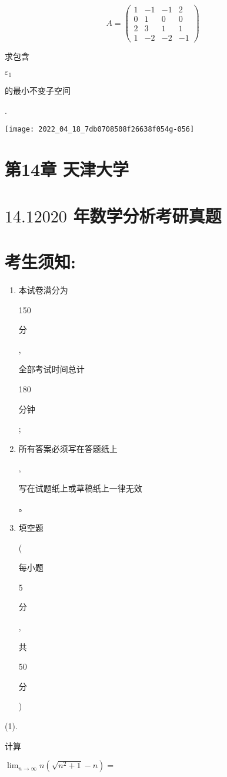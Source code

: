 \documentclass[10pt]{article}
\begin{document}
\begin{enumerate}
\end{enumerate}
$$
A=\left(\begin{array}{cccc}
1 & -1 & -1 & 2 \\
0 & 1 & 0 & 0 \\
2 & 3 & 1 & 1 \\
1 & -2 & -2 & -1
\end{array}\right)
$$
\begin{CJK}{UTF8}{mj}求包含\end{CJK} $\varepsilon_{1}$ \begin{CJK}{UTF8}{mj}的最小不变子空间\end{CJK}.

\texttt{[image: 2022\_04\_18\_7db0708508f26638f054g-056]}

\section{第14章 天津大学}
\section{$14.12020$ 年数学分析考研真题}
\section{考生须知:}
\begin{enumerate}
  \item \begin{CJK}{UTF8}{mj}本试卷满分为\end{CJK} 150 \begin{CJK}{UTF8}{mj}分\end{CJK}, \begin{CJK}{UTF8}{mj}全部考试时间总计\end{CJK} 180 \begin{CJK}{UTF8}{mj}分钟\end{CJK};

  \item \begin{CJK}{UTF8}{mj}所有答案必须写在答题纸上\end{CJK}, \begin{CJK}{UTF8}{mj}写在试题纸上或草稿纸上一律无效\end{CJK}。

  \item \begin{CJK}{UTF8}{mj}填空题\end{CJK} (\begin{CJK}{UTF8}{mj}每小题\end{CJK} 5 \begin{CJK}{UTF8}{mj}分\end{CJK}, \begin{CJK}{UTF8}{mj}共\end{CJK} 50 \begin{CJK}{UTF8}{mj}分\end{CJK})

\end{enumerate}
(1). \begin{CJK}{UTF8}{mj}计算\end{CJK} $\lim _{n \rightarrow \infty} n\left(\sqrt{n^{2}+1}-n\right)=$
\end{document}
